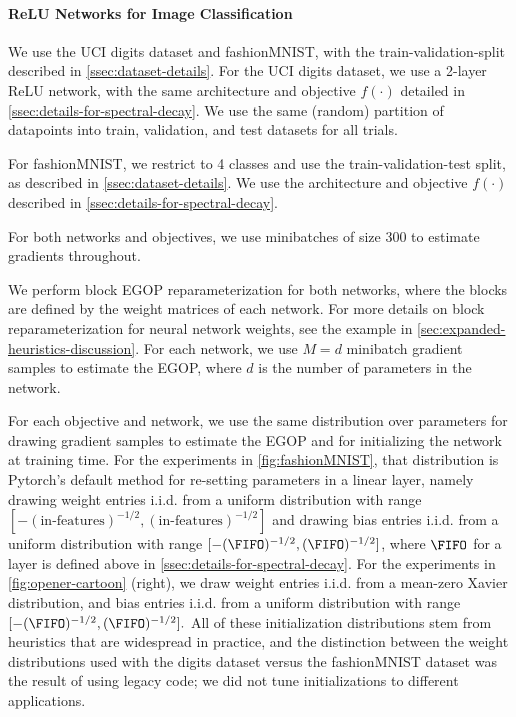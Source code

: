 \paragraph{ReLU Networks for Image Classification} We use the UCI digits dataset and fashionMNIST, with the train-validation-split described in \ref{ssec:dataset-details}. For the UCI digits dataset, we use a 2-layer ReLU network, with the same architecture and objective $f(\cdot)$ detailed in \ref{ssec:details-for-spectral-decay}. We use the same (random) partition of datapoints into train, validation, and test datasets for all trials.

For fashionMNIST, we restrict to 4 classes and use the train-validation-test split, as described in \cref{ssec:dataset-details}. We use the architecture and objective $f(\cdot)$ described in \cref{ssec:details-for-spectral-decay}.

For both networks and objectives, we use minibatches of size 300 to estimate gradients throughout.

We perform block EGOP reparameterization for both networks, where the blocks are defined by the weight matrices of each network. For more details on block reparameterization for neural network weights, see the example in \cref{sec:expanded-heuristics-discussion}. For each network, we use $M=d$ minibatch gradient samples to estimate the EGOP, where $d$ is the number of parameters in the network.

For each objective and network, we use the same distribution over parameters for drawing gradient samples to estimate the EGOP and for initializing the network at training time. For the experiments in \cref{fig:fashionMNIST}, that distribution is Pytorch's default method for re-setting parameters in a linear layer, namely drawing weight entries i.i.d. from a uniform distribution with range $[-(\textrm{in-features})^{-1/2}, (\textrm{in-features})^{-1/2}]$ and drawing bias entries i.i.d. from a uniform distribution with range $[-(\FIFO)^{-1/2},(\FIFO)^{-1/2}]$, where $\FIFO$ for a layer is defined above in \cref{ssec:details-for-spectral-decay}. For the experiments in \cref{fig:opener-cartoon} (right), we draw weight entries i.i.d. from a mean-zero Xavier distribution, and bias entries i.i.d. from a uniform distribution with range $[-(\FIFO)^{-1/2},(\FIFO)^{-1/2}].$ All of these initialization distributions stem from heuristics that are widespread in practice, and the distinction between the weight distributions used with the digits dataset versus the fashionMNIST dataset was the result of using legacy code; we did not tune initializations to different applications.


